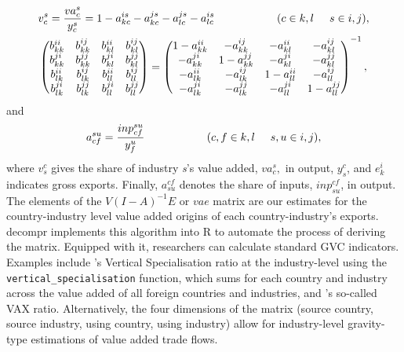 \documentclass[a4paper]{article}\usepackage[]{graphicx}\usepackage[]{color}
\begin{document}
\begin{align*}
&v_{c}^{s} = \frac{va_{c}^{s}}{y_{c}^{s}} = 1 - a_{kc}^{is} - a_{kc}^{js} - a_{lc}^{js} - a_{lc}^{is} \hspace{2cm} (c \in k,l \hspace{.5cm} s \in i,j),\\
&\begin{pmatrix}
b_{kk}^{ii}& b_{kk}^{ij}& b_{kl}^{ii}& b_{kl}^{ij}\\
b_{kk}^{ji}& b_{kk}^{jj}& b_{kl}^{ji}& b_{kl}^{jj}\\
b_{lk}^{ii}& b_{lk}^{ij}& b_{ll}^{ii}& b_{ll}^{ij}\\
b_{lk}^{ji}& b_{lk}^{jj}& b_{ll}^{ji}& b_{ll}^{jj}
\end{pmatrix}
=
\begin{pmatrix}
1-a_{kk}^{ii}& -a_{kk}^{ij}& -a_{kl}^{ii}& -a_{kl}^{ij}\\
-a_{kk}^{ji}& 1-a_{kk}^{jj}& -a_{kl}^{ji}& -a_{kl}^{jj}\\
-a_{lk}^{ii}& -a_{lk}^{ij}& 1-a_{ll}^{ii}& -a_{ll}^{ij}\\
-a_{lk}^{ji}& -a_{lk}^{jj}& -a_{ll}^{ji}& 1-a_{ll}^{jj}
\end{pmatrix}^{-1},
\end{align*}
and
\begin{equation*}
a_{cf}^{su} = \frac{inp_{cf}^{su}}{y_{f}^{u}}  \hspace{2cm} (c,f \in k,l \hspace{.5cm} s,u \in i,j),
\end{equation*}
where \(v_{s}^{c}\) gives the share of industry \emph{s}'s value added, \(va_{c}^{s},\) in output, \(y_{s}^{c}\), and \(e_{k}^{i}\) indicates gross exports. Finally, \(a_{su}^{cf}\) denotes the share of inputs, \(inp_{su}^{cf}\), in output.
The elements of the $V(I-A)^{-1}E$ or $vae$ matrix are our estimates for the country-industry level value added
origins of each country-industry's exports.
decompr implements this algorithm into R to automate the process of deriving the matrix. 
Equipped with it, researchers can calculate standard GVC indicators.
Examples include \textcite{dahuetal01}'s Vertical Specialisation ratio at the industry-level using the \verb!vertical_specialisation! function, 
which sums for each country and industry across the value added of all foreign countries and industries,
and \textcite{rojoguno12}'s so-called VAX ratio.
Alternatively, the four dimensions of the matrix (source country, source industry, using country, using industry) allow for industry-level gravity-type estimations of value added trade flows.
\end{document}
